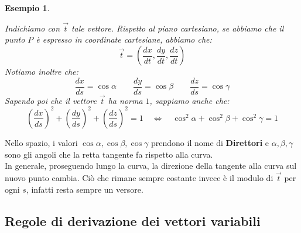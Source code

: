 \documentclass[11pt,a4paper,twoside]{article}
\newtheorem{es}{Esempio}
\theoremstyle{definition}
\begin{document}
\begin{es}
	\begin{center}
	\end{center}
	Indichiamo con $\vec t$ tale vettore. Rispetto al piano cartesiano, se abbiamo che il punto $P$ è espresso in coordinate cartesiane, abbiamo che:
	\[
		\vec t = \left( \frac{dx}{dt}, \frac{dy}{dt}, \frac{dz}{dt} \right)
	\]
	Notiamo inoltre che:
	\[
		\frac{dx}{ds} = \cos \alpha \qquad \frac{dy}{ds} = \cos \beta \qquad \frac{dz}{ds} = \cos \gamma
	\]
	Sapendo poi che il vettore $\vec t$ ha norma $1$, sappiamo anche che:
	\[
		\left( \frac{dx}{ds} \right)^2 + \left( \frac{dy}{ds} \right)^2 + \left( \frac{dz}{ds} \right)^2=1 \quad \Leftrightarrow \quad \cos^2 \alpha + \cos^2 \beta + \cos^2 \gamma = 1
	\]
\end{es}

Nello spazio, i valori $\cos \alpha, \cos \beta, \cos \gamma$ prendono il nome di \textbf{Direttori} e $\alpha, \beta, \gamma$ sono gli angoli che la retta tangente fa rispetto alla curva.\\
In generale, proseguendo lungo la curva, la direzione della tangente alla curva sul nuovo punto cambia. Ciò che rimane sempre costante invece è il modulo di $\vec t$ per ogni $s$, infatti resta sempre un versore.

\subsection{Regole di derivazione dei vettori variabili}
\end{document}
